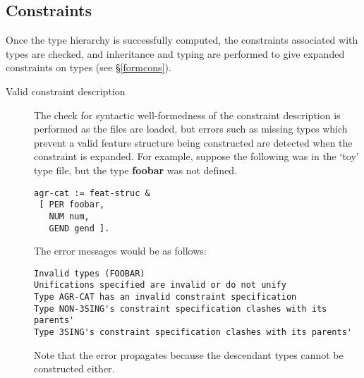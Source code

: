 \documentclass[12pt]{report}
\begin{document}
\subsection{Constraints}
Once the type hierarchy is successfully computed, the constraints
associated with types are checked, and inheritance
and typing are performed to give expanded constraints on types
(see \S\ref{formcons}).
\begin{description}
\item[Valid constraint description]
The check for syntactic well-formedness of the constraint description
is performed as the files are loaded, but errors such as 
missing types which prevent a valid feature structure being constructed
are detected when the constraint is expanded.
For example, suppose the following was in the 
`toy' type file, but the type 
{\bf foobar} was not defined.
\begin{verbatim}
agr-cat := feat-struc &
 [ PER foobar,
   NUM num,
   GEND gend ].
\end{verbatim}
The error messages would be as follows:
\begin{verbatim}
Invalid types (FOOBAR)
Unifications specified are invalid or do not unify
Type AGR-CAT has an invalid constraint specification
Type NON-3SING's constraint specification clashes with its parents'
Type 3SING's constraint specification clashes with its parents'
\end{verbatim}
Note that the error propagates because the descendant types cannot
be constructed either.


\end{description}
\end{document}
